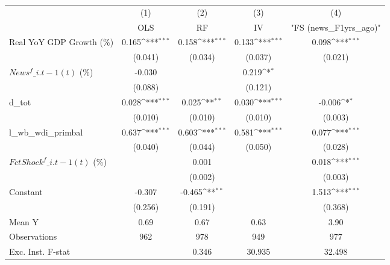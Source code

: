 {
\def\sym#1{\ifmmode^{#1}\else\(^{#1}\)\fi}
\begin{tabular}{l*{4}{c}}
\toprule
                    &\multicolumn{1}{c}{(1)}&\multicolumn{1}{c}{(2)}&\multicolumn{1}{c}{(3)}&\multicolumn{1}{c}{(4)}\\
                    &\multicolumn{1}{c}{OLS}&\multicolumn{1}{c}{RF}&\multicolumn{1}{c}{IV}&\multicolumn{1}{c}{ "FS (news\_F1yrs\_ago)" }\\
\midrule
Real YoY GDP Growth (\%)&       0.165\sym{***}&       0.158\sym{***}&       0.133\sym{***}&       0.098\sym{***}\\
                    &     (0.041)         &     (0.034)         &     (0.037)         &     (0.021)         \\
\addlinespace
$ News^f\_{i.t-1}(t)$ (\%)&      -0.030         &                     &       0.219\sym{*}  &                     \\
                    &     (0.088)         &                     &     (0.121)         &                     \\
\addlinespace
d\_tot               &       0.028\sym{***}&       0.025\sym{**} &       0.030\sym{***}&      -0.006\sym{*}  \\
                    &     (0.010)         &     (0.010)         &     (0.010)         &     (0.003)         \\
\addlinespace
l\_wb\_wdi\_primbal    &       0.637\sym{***}&       0.603\sym{***}&       0.581\sym{***}&       0.077\sym{***}\\
                    &     (0.040)         &     (0.044)         &     (0.050)         &     (0.028)         \\
\addlinespace
$ FctShock^f\_{i.t-1}(t)$ (\%)&                     &       0.001         &                     &       0.018\sym{***}\\
                    &                     &     (0.002)         &                     &     (0.003)         \\
\addlinespace
Constant            &      -0.307         &      -0.465\sym{**} &                     &       1.513\sym{***}\\
                    &     (0.256)         &     (0.191)         &                     &     (0.368)         \\
\midrule
Mean Y              &        0.69         &        0.67         &        0.63         &        3.90         \\
Observations        &         962         &         978         &         949         &         977         \\
Exc. Inst. F-stat   &                     &       0.346         &      30.935         &      32.498         \\
\bottomrule
\end{tabular}
}
